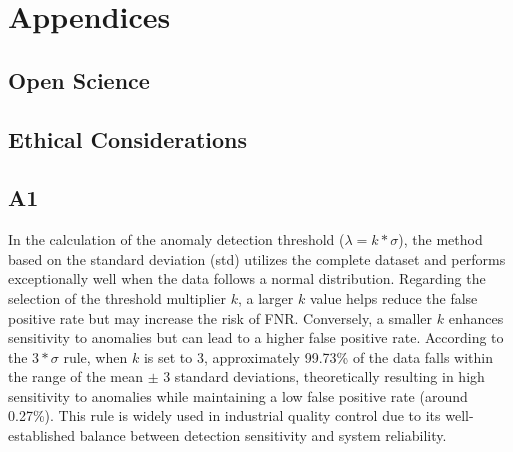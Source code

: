\documentclass[sigconf]{acmart}
\begin{document}





\appendix

\section{Appendices}
\label{appendix:parameters}

\subsection{Open Science}


\subsection{Ethical Considerations}

\subsection{A1}
In the calculation of the anomaly detection threshold ($\lambda = k*\sigma$), the method based on the standard deviation (std) utilizes the complete dataset and performs exceptionally well when the data follows a normal distribution.
Regarding the selection of the threshold multiplier $k$, a larger $k$ value helps reduce the false positive rate but may increase the risk of FNR. Conversely, a smaller $k$ enhances sensitivity to anomalies but can lead to a higher false positive rate. According to the $3*\sigma$ rule, when $k$ is set to 3, approximately 99.73\% of the data falls within the range of the mean $±$ 3 standard deviations, theoretically resulting in high sensitivity to anomalies while maintaining a low false positive rate (around 0.27\%). This rule is widely used in industrial quality control due to its well-established balance between detection sensitivity and system reliability.
\end{document}

